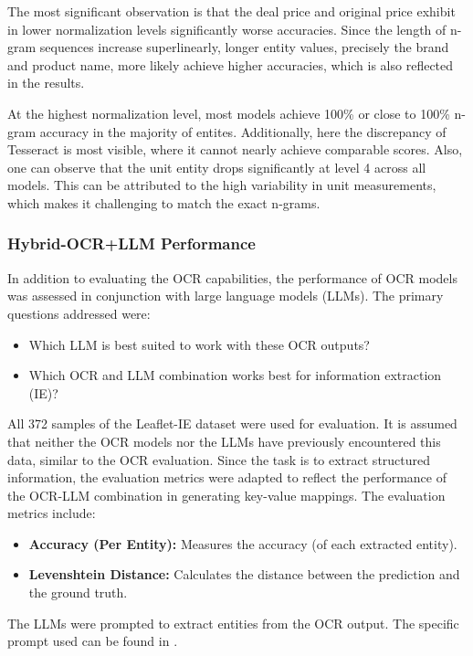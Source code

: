 \documentclass[11pt]{article}
\begin{document}
The most significant observation is that the deal price and original price exhibit in lower normalization levels significantly worse accuracies. Since the length of n-gram sequences increase superlinearly, longer entity values, precisely the brand and product name, more likely achieve higher accuracies, which is also reflected in the results.

At the highest normalization level, most models achieve 100\% or close to 100\% n-gram accuracy in the majority of entites. Additionally, here the discrepancy of Tesseract is most visible, where it cannot nearly achieve comparable scores. Also, one can observe that the unit entity drops significantly at level 4 across all models. This can be attributed to the high variability in unit measurements, which makes it challenging to match the exact n-grams.


\subsubsection{Hybrid-OCR+LLM Performance}

In addition to evaluating the OCR capabilities, the performance of OCR models was assessed in conjunction with large language models (LLMs). The primary questions addressed were:
\begin{itemize}
    \item Which LLM is best suited to work with these OCR outputs?
    \item Which OCR and LLM combination works best for information extraction (IE)?
\end{itemize}

All 372 samples of the Leaflet-IE dataset were used for evaluation. It is assumed that neither the OCR models nor the LLMs have previously encountered this data, similar to the OCR evaluation. Since the task is to extract structured information, the evaluation metrics were adapted to reflect the performance of the OCR-LLM combination in generating key-value mappings. The evaluation metrics include:
\begin{itemize}
    \item \textbf{Accuracy (Per Entity):} Measures the accuracy (of each extracted entity).
    \item \textbf{Levenshtein Distance:} Calculates the distance between the prediction and the ground truth.
\end{itemize}

The LLMs were prompted to extract entities from the OCR output. The specific prompt used can be found in .
\end{document}
